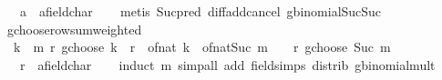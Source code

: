 \begin{isabellebody}
\ \ \ a\ {\isacharcolon}{\kern0pt}{\isacharcolon}{\kern0pt}\ {\isachardoublequoteopen}{\isacharprime}{\kern0pt}a{\isacharcolon}{\kern0pt}{\isacharcolon}{\kern0pt}field{\isacharunderscore}{\kern0pt}char{\isacharunderscore}{\kern0pt}{}{\isachardoublequoteclose}\isanewline
%
\isadelimproof
\ \ %
\endisadelimproof
%
\isatagproof
{}\isamarkupfalse%
\ {\isacharparenleft}{\kern0pt}metis\ Suc{\isacharunderscore}{\kern0pt}pred{\isacharprime}{\kern0pt}\ diff{\isacharunderscore}{\kern0pt}add{\isacharunderscore}{\kern0pt}cancel\ gbinomial{\isacharunderscore}{\kern0pt}Suc{\isacharunderscore}{\kern0pt}Suc{\isacharparenright}{\kern0pt}%
\endisatagproof
{\isafoldproof}%
%
\isadelimproof
\isanewline
%
\endisadelimproof
\isanewline
{}\isamarkupfalse%
\ gchoose{\isacharunderscore}{\kern0pt}row{\isacharunderscore}{\kern0pt}sum{\isacharunderscore}{\kern0pt}weighted{\isacharcolon}{\kern0pt}\isanewline
\ \ {\isachardoublequoteopen}{\isacharparenleft}{\kern0pt}{\isasymSum}k\ {\isacharequal}{\kern0pt}\ {}{\isachardot}{\kern0pt}{\isachardot}{\kern0pt}m{\isachardot}{\kern0pt}\ {\isacharparenleft}{\kern0pt}r\ gchoose\ k{\isacharparenright}{\kern0pt}\ {\isacharasterisk}{\kern0pt}\ {\isacharparenleft}{\kern0pt}r{\isacharslash}{\kern0pt}{}\ {\isacharminus}{\kern0pt}\ of{\isacharunderscore}{\kern0pt}nat\ k{\isacharparenright}{\kern0pt}{\isacharparenright}{\kern0pt}\ {\isacharequal}{\kern0pt}\ of{\isacharunderscore}{\kern0pt}nat{\isacharparenleft}{\kern0pt}Suc\ m{\isacharparenright}{\kern0pt}\ {\isacharslash}{\kern0pt}\ {}\ {\isacharasterisk}{\kern0pt}\ {\isacharparenleft}{\kern0pt}r\ gchoose\ {\isacharparenleft}{\kern0pt}Suc\ m{\isacharparenright}{\kern0pt}{\isacharparenright}{\kern0pt}{\isachardoublequoteclose}\isanewline
\ \ \ r\ {\isacharcolon}{\kern0pt}{\isacharcolon}{\kern0pt}\ {\isachardoublequoteopen}{\isacharprime}{\kern0pt}a{\isacharcolon}{\kern0pt}{\isacharcolon}{\kern0pt}field{\isacharunderscore}{\kern0pt}char{\isacharunderscore}{\kern0pt}{}{\isachardoublequoteclose}\isanewline
%
\isadelimproof
\ \ %
\endisadelimproof
%
\isatagproof
{}\isamarkupfalse%
\ {\isacharparenleft}{\kern0pt}induct\ m{\isacharparenright}{\kern0pt}\ {\isacharparenleft}{\kern0pt}simp{\isacharunderscore}{\kern0pt}all\ add{\isacharcolon}{\kern0pt}\ field{\isacharunderscore}{\kern0pt}simps\ distrib\ gbinomial{\isacharunderscore}{\kern0pt}mult{\isacharunderscore}{\kern0pt}{}{\isacharparenright}{\kern0pt}%
\endisatagproof
{\isafoldproof}%
%
\isadelimproof
\isanewline

\end{isabellebody}
